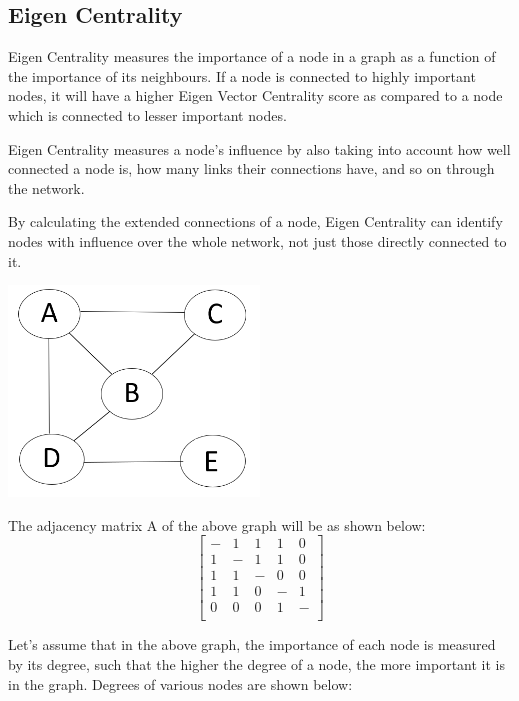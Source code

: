 \documentclass[12pt, a4paper]{article}
\begin{document}
    \subsection{Eigen Centrality}
    \begin{flushleft}

    Eigen Centrality measures the importance of a node in a graph as a function of the importance of its neighbours. If a node is connected to highly important nodes, it will have a higher Eigen Vector Centrality score as compared to a node which is connected to lesser important nodes.
    
    Eigen Centrality measures a node’s influence by also taking into account how well connected a node is, how many links their connections have, and so on through the network.
    
    By calculating the extended connections of a node, Eigen Centrality can identify nodes with influence over the whole network, not just those directly connected to it.

    \includegraphics[width=0.5\textwidth, center]{graph}
    
    The adjacency matrix A of the above graph will be as shown below:
    \begin{equation*}
    \begin{bmatrix}
    - & 1 & 1 & 1 & 0 \\
    1 & - & 1 & 1 & 0 \\
    1 & 1 & - & 0 & 0 \\
    1 & 1 & 0 & - & 1 \\
    0 & 0 & 0 & 1 & - \\
    \end{bmatrix}
    \end{equation*}
    
    Let’s assume that in the above graph, the importance of each node is measured by its degree, such that the higher the degree of a node, the more important it is in the graph. Degrees of various nodes are shown below:
    

\end{flushleft}
\end{document}
